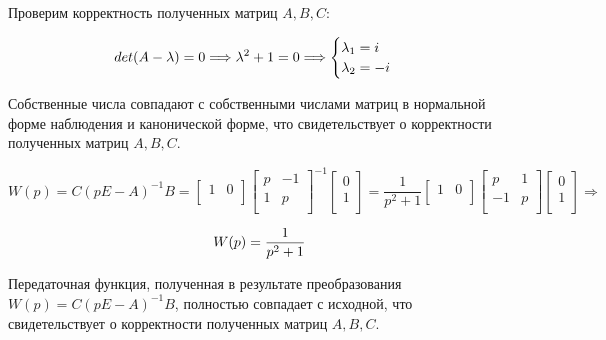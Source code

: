 \documentclass[14pt,a4paper,report]{report}
\begin{document}
Проверим корректность полученных матриц $A, B, C$:

\begin{equation*}
\text{$det(A-\lambda)=0$}
\Longrightarrow
\text{$ \lambda^2 + 1=0$}
\Longrightarrow
\begin{cases}
	\text{$\lambda_1=i$} \\
	\text{$\lambda_2=-i$}
\end{cases}
\end{equation*}

Собственные числа совпадают с собственными числами матриц в нормальной форме наблюдения и канонической форме, что свидетельствует о корректности полученных матриц  $A, B, C$.

\begin{equation*}
\text{$W(p)=C(pE-A)^{-1}B=
\begin{bmatrix}
1 & 0\\
\end{bmatrix}
\begin{bmatrix}
p & -1 \\
1 & p\\
\end{bmatrix}^{-1}
\begin{bmatrix}
0 \\
1 \\
\end{bmatrix}=
\frac{1}{p^2 + 1}
\begin{bmatrix}
1 & 0 \\
\end{bmatrix}
\begin{bmatrix}
p & 1 \\
-1 & p\\
\end{bmatrix}
\begin{bmatrix}
0 \\
1 \\
\end{bmatrix}
\Longrightarrow
$}
\end{equation*}

\begin{equation*}
\text{$ W(p) = \frac{1}{p^2 + 1}$} 
\end{equation*}

Передаточная функция, полученная в результате преобразования $W(p)=C(pE-A)^{-1}B$, полностью совпадает с исходной, что свидетельствует о корректности полученных матриц  $A, B, C$. 

\end{document}
